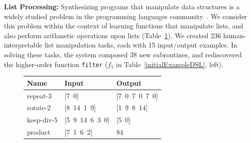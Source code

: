 \documentclass{article}
\newcommand{\code}[1]{{\footnotesize\texttt{#1}}}
\begin{document}
\textbf{List Processing:} Synthesizing programs that manipulate data structures is a widely studied
problem in the programming languages community~\cite{feser2015synthesizing}.
We consider this problem within the context of learning functions that
manipulate lists, and also perform arithmetic operations upon lists (Table~\ref{listExamples}).
We created 236 human-interpretable list manipulation tasks, each with 15
input/output examples.
In solving these tasks, the system
composed 38 new subroutines, and rediscovered the higher-order
function \code{filter} ($f_1$ in Table~\ref{initialExampleDSL}, left).%
\begin{figure}[b]\centering
\vspace{-0.5cm}  \begin{tabular}{lll}
    \toprule
    Name & Input & Output \\\midrule
    repeat-3 & [7\, 0] & [7\, 0\, 7\, 0\, 7\, 0] \\
    rotate-2 & [8\, 14\, 1\, 9] & [1\, 9\, 8\, 14] \\
    keep-div-5 & [5\, 9\, 14\, 6\, 3\, 0] & [5\, 0] \\
    product & [7\, 1\, 6\, 2] & 84 \\
    \bottomrule
  \end{tabular}
  \label{listExamples}\vspace{-0.5cm}
\end{figure}
\end{document}
